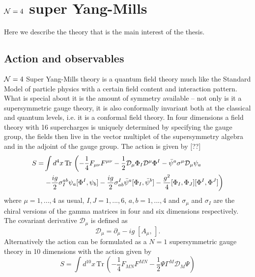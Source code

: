 
\section{$\mathcal{N}=4$ super Yang-Mills}

Here we describe the theory that is the main interest of the thesis.

\subsection{Action and observables}


$\mathcal{N}=4$ Super Yang-Mills theory is a quantum field theory much like the Standard Model of particle physics with a certain field content and interaction pattern. What is special about it is the amount of symmetry available -- not only is it a supersymmetric gauge theory, it is also conformally invariant both at the classical and quantum levels, i.e. it is a conformal field theory. In four dimensions a field theory with 16 supercharges is uniquely determined by specifying the gauge group, the fields then live in the vector multiplet of the supersymmetry algebra and in the adjoint of the gauge group. The action is given by [??]
\begin{equation}
\begin{split}
S = & \int d^4 x \, \mathrm{Tr} \, \left( - \frac{1}{4}  F_{\mu\nu} F^{\mu\nu}  - \frac{1}{2} \mathcal{D}_\mu \Phi_I \mathcal{D}^\mu \Phi^I - \bar{\psi}^a \sigma^\mu \mathcal{D}_\mu \psi_a \right. \\
	& \left. - \frac{ig}{2} \sigma^{ab}_I \psi_a [\Phi^I, \psi_b] - \frac{ig}{2} \sigma_{ab}^I \bar{\psi}^a [\Phi_I, \bar{\psi}^b] - \frac{g^2}{4} [\Phi_I, \Phi_J] [\Phi^I, \Phi^J] \right)
\end{split}
\label{eq:n4_action}
\end{equation}
where $\mu= 1, ..., 4$ as usual, $I, J = 1, ..., 6$, $a, b = 1, ..., 4$ and $\sigma_\mu$ and $\sigma_I$ are the chiral versions of the gamma matrices in four and six dimensions respectively. The covariant derivative $\mathcal{D}_\mu$ is defined as
\begin{equation}
	\mathcal{D}_\mu = \partial_\mu - ig \; [A_\mu, \, ].
\end{equation}
Alternatively the action can be formulated as a $N=1$ supersymmetric gauge theory in 10 dimensions with the action given by
\begin{equation}
	S = \int d^{10} x \, \mathrm{Tr} \, \left( - \frac{1}{4}  F_{MN} F^{MN}  - \frac{1}{2} \Psi \Gamma^M \mathcal{D}_M \Psi \right)
\end{equation}
